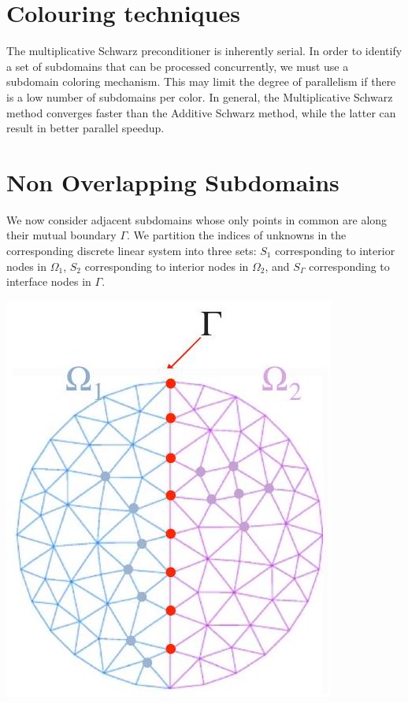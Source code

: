 \documentclass[11pt]{book}
\begin{document}
\section*{Colouring techniques}

 The multiplicative Schwarz preconditioner is inherently serial. In order to identify a set of subdomains that can be processed concurrently, we must use a subdomain coloring mechanism. This may limit the degree of parallelism if there is a low number of subdomains per color. In general, the Multiplicative Schwarz method converges faster than the Additive Schwarz method, while the latter can result in better parallel speedup. 

\section*{Non Overlapping Subdomains}
We now consider adjacent subdomains whose only points in common are along their mutual boundary $\Gamma$. We partition the indices of unknowns in the corresponding discrete linear system into three sets: $S_{1}$ corresponding to interior nodes in $\Omega_{1}$, $S_{2}$ corresponding to interior nodes in $\Omega_{2}$, and $S_{\Gamma}$ corresponding to interface nodes in $\Gamma$. \\
\begin{center}
\includegraphics[scale = 0.35]{2023_09_05_b72ccc85584d9dc6fb5cg-191}
\end{center}
\end{document}
